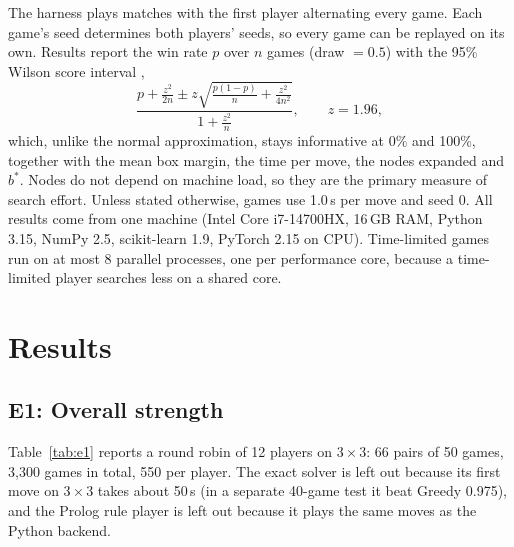 \documentclass[11pt,a4paper]{article}
\newcommand{\bd}[2]{$#1{\times}#2$}            %
\begin{document}
The harness plays matches with the first player alternating every game. Each game's seed
determines both players' seeds, so every game can be replayed on its own. Results report
the win rate $p$ over $n$ games (draw $=0.5$) with the 95\% Wilson score interval
\cite{wilson1927interval},
\begin{equation}
  \frac{p + \frac{z^2}{2n} \pm z\sqrt{\frac{p(1-p)}{n} + \frac{z^2}{4n^2}}}{1 + \frac{z^2}{n}},
  \qquad z = 1.96,
  \label{eq:wilson}
\end{equation}
which, unlike the normal approximation, stays informative at 0\% and 100\%, together with
the mean box margin, the time per move, the nodes expanded and $b^*$. Nodes do not depend
on machine load, so they are the primary measure of search effort. Unless stated otherwise, games use 1.0\,s per move and seed 0.
All results come from one machine (Intel Core i7-14700HX, 16\,GB RAM, Python 3.15,
NumPy 2.5, scikit-learn 1.9, PyTorch 2.15 on CPU). Time-limited games run on at most 8
parallel processes, one per performance core, because a time-limited player searches
less on a shared core.

\section{Results}
\label{sec:results}

\subsection{E1: Overall strength}

Table~\ref{tab:e1} reports a round robin of 12 players on \bd{3}{3}: 66 pairs of 50 games,
3{,}300 games in total, 550 per player. The exact solver is left out because its first move
on \bd{3}{3} takes about 50\,s (in a separate 40-game test it beat Greedy 0.975), and the
Prolog rule player is left out because it plays the same moves as the Python backend.
\end{document}
